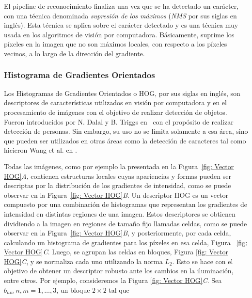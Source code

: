	
	El pipeline de reconocimiento finaliza una vez que se ha detectado un carácter, con una técnica denominada \textit{supresión de los máximos} (\textit{NMS} por sus siglas en inglés). Esta técnica se aplica sobre el carácter detectado y es una técnica muy usada en los algoritmos de visión por computadora. Básicamente, suprime los píxeles en la imagen que no son máximos locales, con respecto a los píxeles vecinos, a lo largo de la dirección del gradiente.

\subsubsection{Histograma de Gradientes Orientados}
\label{subsubsection:hog}

	Los Histogramas de Gradientes Orientados o HOG, por sus siglas en inglés, son descriptores de características utilizados en visión por computadora y en el procesamiento de imágenes con el objetivo de realizar detección de objetos. Fueron introducidos por N. Dalal y B. Triggs en~\cite{DT05} con el propósito de realizar detección de personas. Sin embargo, su uso no se limita solamente a esa área, sino que pueden ser utilizados en otras áreas como la detección de caracteres tal como hicieron Wang et al. en \cite{wang}.
	
	Todas las imágenes, como por ejemplo la presentada en la Figura~\ref{fig: Vector HOG}\textit{A}, contienen estructuras locales cuyas apariencias y formas pueden ser descriptas por la distribución de los gradientes de intensidad, como se puede observar en la Figura~\ref{fig: Vector HOG}\textit{B}.
	Un descriptor HOG es un vector compuesto por una combinación de histogramas que representan los gradientes de intensidad en distintas regiones de una imagen. Estos descriptores se obtienen dividiendo a la imagen en regiones de tamaño fijo llamadas celdas, como se puede observar en la Figura~\ref{fig: Vector HOG}\textit{B}, y posteriormente, por cada celda, calculando un histograma de gradientes para los píxeles en esa celda, Figura ~\ref{fig: Vector HOG}\textit{C}.
	Luego, se agrupan las celdas en bloques, Figura \ref{fig: Vector HOG}\textit{C}, y se normaliza cada uno utilizando la norma $L_{2}$. Esto se hace con el objetivo de obtener un descriptor robusto ante los cambios en la iluminación, entre otros. Por ejemplo, consideremos la Figura \ref{fig: Vector HOG}\textit{C}. Sea $b_{nm}~n,m=1,\dots,3$, un bloque $2 \times 2$ tal que 
	
